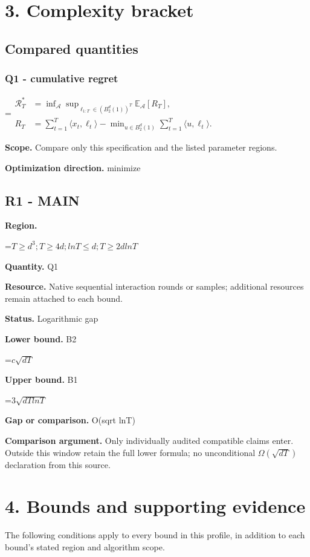 \documentclass[10pt,a4paper]{article}
\newcommand{\AtlasMath}[1]{\par\begingroup\centering\setbox0=\hbox{$\displaystyle #1$}\ifdim\wd0>1.4\linewidth\typeout{ATLAS WIDE FORMULA: \the\wd0}\fi\ifdim\wd0>\linewidth\resizebox{\linewidth}{!}{\box0}\else\box0\fi\par\endgroup}
\begin{document}
\section{3. Complexity bracket}
\subsection{Compared quantities}
\subsubsection{Q1 - cumulative regret}
\AtlasMath{\begin{aligned}\mathcal R_T^*&=\inf_{\mathcal A}\sup_{\ell_{1:T}\in(B_2^d(1))^T}\mathbb E_{\mathcal A}[R_T],\\ R_T&=\sum_{t=1}^T\langle x_t,\ell_t\rangle-\min_{u\in B_2^d(1)}\sum_{t=1}^T\langle u,\ell_t\rangle.\end{aligned}}
\textbf{Scope.} Compare only this specification and the listed parameter regions.

\textbf{Optimization direction.} minimize

\subsection{R1 - MAIN}
\textbf{Region.}

\AtlasMath{T\ge d^3; T\ge 4d; lnT\le d; T\ge 2d lnT}
\textbf{Quantity.} Q1

\textbf{Resource.} Native sequential interaction rounds or samples; additional resources remain attached to each bound.

\textbf{Status.} Logarithmic gap

\textbf{Lower bound.} B2

\AtlasMath{c \sqrt{dT}}
\textbf{Upper bound.} B1

\AtlasMath{3\sqrt{dTlnT}}
\textbf{Gap or comparison.} O(sqrt lnT)

\textbf{Comparison argument.} Only individually audited compatible claims enter. Outside this window retain the full lower formula; no unconditional $\Omega (\sqrt{dT})$ declaration from this source.

\section{4. Bounds and supporting evidence}
The following conditions apply to every bound in this profile, in addition to each bound's stated region and algorithm scope.
\end{document}
